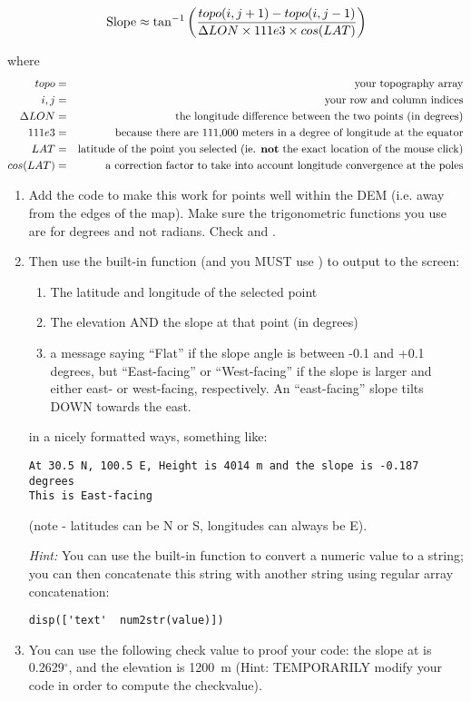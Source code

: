 \documentclass[letterpaper,12pt]{article}
\begin{document}
\newpage

\begin{equation}
{\rm Slope} \approx \tan^{-1}\left( \frac{topo(i,j+1) - topo(i,j-1)}{ \Delta LON \times 111e3 \times cos(LAT)} \right)
\end{equation}

where
\begin{eqnarray}
topo &=& \text{your topography array}\\
i,j &=& \text{your row and column indices}\\
\Delta LON &=& \text{ the longitude difference between the two points (in degrees)} \\
111e3 &=& \text{because there are 111,000 meters in a degree of longitude at the equator} \\
LAT &=& \text{latitude of the point you selected (ie. {\bf not} the exact location of the mouse click)} \\
cos(LAT) &=& \text{ a correction factor to take into account  longitude convergence at the poles}
\end{eqnarray}
\begin{enumerate}
\item Add the code to make this work for points well within the DEM (i.e. away from the edges of the map). Make
sure the trigonometric functions you use are for degrees and not radians. Check  and .

\item Then use the built-in function  (and you MUST use )  to output to the screen: 
\begin{enumerate}
\item The latitude and longitude of the selected point
\item The elevation AND the slope at that point (in degrees)
\item a message saying ``Flat'' if the slope angle is between -0.1 and
+0.1 degrees, but ``East-facing'' or ``West-facing'' if the slope is larger and either east- or west-facing, respectively. An ``east-facing'' slope tilts DOWN towards the east.
\end{enumerate}
in a nicely formatted ways, something like:
\begin{lstlisting}
At 30.5 N, 100.5 E, Height is 4014 m and the slope is -0.187 degrees
This is East-facing
\end{lstlisting}
(note - latitudes can be N or S, longitudes can always be E).

\emph{Hint:} You can use the built-in function  to convert a numeric value to a string; you can then concatenate this string with another string using regular array concatenation: 
\begin{lstlisting}
disp(['text'  num2str(value)])
\end{lstlisting}

\item You can use the following check value to proof your code: the slope at  is 0.2629$^{\circ}$, and the elevation
is 1200~m (Hint: TEMPORARILY modify your code
in order to compute the checkvalue).
\end{enumerate}
\end{document}
